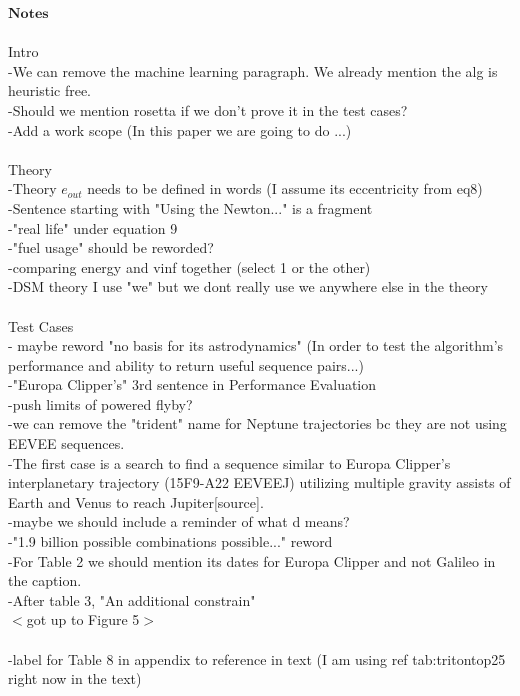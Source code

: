 \documentclass[letterpaper, paper,11pt]{./AAS}		%
\begin{document}
\clearpage
\noindent $\textbf{Notes}$
\\
\\\noindent Intro
		\\-We can remove the machine learning paragraph. We already mention the alg is heuristic free.
		\\-Should we mention rosetta if we don't prove it in the test cases?
		\\-Add a work scope (In this paper we are going to do ...)
\\
\\\noindent Theory
    \\-Theory $e_{out}$ needs to be defined in words (I assume its eccentricity from eq8)
		\\-Sentence starting with "Using the Newton..." is a fragment
		\\-"real life" under equation 9
		\\-"fuel usage" should be reworded?
		\\-comparing energy and vinf together (select 1 or the other)
		\\-DSM theory I use "we" but we dont really use we anywhere else in the theory
\\
\\\noindent Test Cases
		\\- maybe reword "no basis for its astrodynamics" (In order to test the algorithm's performance and ability to return useful sequence pairs...)
		\\-"Europa Clipper's" 3rd sentence in Performance Evaluation
		\\-push limits of powered flyby?
		\\-we can remove the "trident" name for Neptune trajectories bc they are not using EEVEE sequences.
		\\-The first case is a search to find a sequence similar to Europa Clipper's interplanetary trajectory (15F9-A22 EEVEEJ) utilizing multiple gravity assists of Earth and Venus to reach Jupiter[source].
		\\-maybe we should include a reminder of what d means?
		\\-"1.9 billion possible combinations possible..." reword
		\\-For Table 2 we should mention its dates for Europa Clipper and not Galileo in the caption.
		\\-After table 3, "An additional constrain"
		\\$<$got up to Figure 5$>$
		\\
	  \\-label for Table 8 in appendix to reference in text (I am using ref tab:tritontop25  right now in the text)


\phantom{p. 1}
\clearpage


\end{document}
